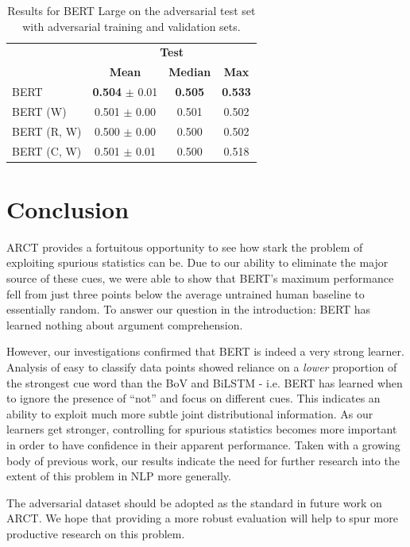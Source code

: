 \documentclass[11pt,a4paper]{article}
\begin{document}
\begin{table}[t]
\begin{center}
\small
\begin{tabular}{|l|ccc|}
\hline
\multirow{2}{*}{} & \multicolumn{3}{c|}{\textbf{Test}} \\
& \textbf{Mean} & \textbf{Median} & \textbf{Max} \\
\hline
BERT & \textbf{0.504} $\pm$ 0.01 & \textbf{0.505} & \textbf{0.533} \\
BERT (W) & 0.501 $\pm$ 0.00 & 0.501 & 0.502 \\
BERT (R, W) & 0.500 $\pm$ 0.00 & 0.500 & 0.502 \\
BERT (C, W) & 0.501 $\pm$ 0.01 & 0.500 & 0.518 \\
\hline
\end{tabular}
\end{center}
\caption{Results for BERT Large on the adversarial test set with adversarial training and validation sets.}
\end{table}

\section{Conclusion}

ARCT provides a fortuitous opportunity to see how stark the problem of exploiting spurious statistics can be. Due to our ability to eliminate the major source of these cues, we were able to show that BERT's maximum performance fell from just three points below the average untrained human baseline to essentially random. To answer our question in the introduction: BERT has learned nothing about argument comprehension. 

However, our investigations confirmed that BERT is indeed a very strong learner. Analysis of easy to classify data points showed reliance on a \textit{lower} proportion of the strongest cue word than the BoV and BiLSTM - i.e. BERT has learned when to ignore the presence of ``not'' and focus on different cues. This indicates an ability to exploit much more subtle joint distributional information. As our learners get stronger, controlling for spurious statistics becomes more important in order to have confidence in their apparent performance. Taken with a growing body of previous work, our results indicate the need for further research into the extent of this problem in NLP more generally.

The adversarial dataset should be adopted as the standard in future work on ARCT. We hope that providing a more robust evaluation will help to spur more productive research on this problem.
\end{document}
